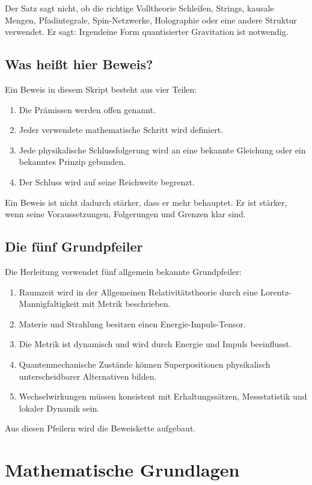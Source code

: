 \documentclass[11pt,a4paper,oneside]{book}
\theoremstyle{definition}
\theoremstyle{plain}
\theoremstyle{remark}
\begin{document}
Der Satz sagt nicht, ob die richtige Volltheorie Schleifen, Strings, kausale Mengen, Pfadintegrale, Spin-Netzwerke, Holographie oder eine andere Struktur verwendet. Er sagt: Irgendeine Form quantisierter Gravitation ist notwendig.

\section{Was heißt hier Beweis?}
Ein Beweis in diesem Skript besteht aus vier Teilen:

\begin{enumerate}[label=\arabic*.]
\item Die Prämissen werden offen genannt.
\item Jeder verwendete mathematische Schritt wird definiert.
\item Jede physikalische Schlussfolgerung wird an eine bekannte Gleichung oder ein bekanntes Prinzip gebunden.
\item Der Schluss wird auf seine Reichweite begrenzt.
\end{enumerate}

Ein Beweis ist nicht dadurch stärker, dass er mehr behauptet. Er ist stärker, wenn seine Voraussetzungen, Folgerungen und Grenzen klar sind.

\section{Die fünf Grundpfeiler}
Die Herleitung verwendet fünf allgemein bekannte Grundpfeiler:

\begin{enumerate}[label=\textbf{P\arabic*.}]
\item Raumzeit wird in der Allgemeinen Relativitätstheorie durch eine Lorentz-Mannigfaltigkeit mit Metrik beschrieben.
\item Materie und Strahlung besitzen einen Energie-Impuls-Tensor.
\item Die Metrik ist dynamisch und wird durch Energie und Impuls beeinflusst.
\item Quantenmechanische Zustände können Superpositionen physikalisch unterscheidbarer Alternativen bilden.
\item Wechselwirkungen müssen konsistent mit Erhaltungssätzen, Messstatistik und lokaler Dynamik sein.
\end{enumerate}

Aus diesen Pfeilern wird die Beweiskette aufgebaut.

\chapter{Mathematische Grundlagen}
\end{document}
